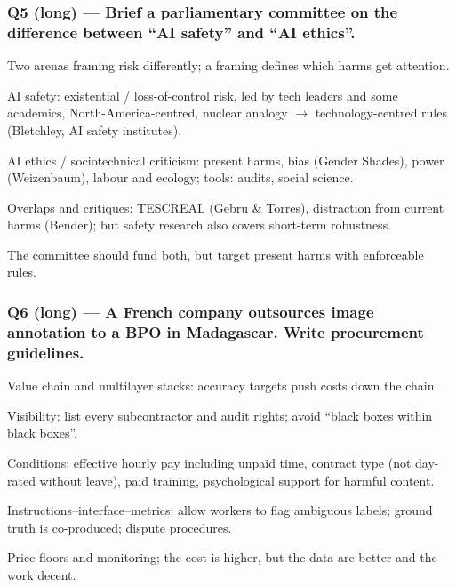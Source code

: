 \documentclass[11pt,a4paper]{article}
\newcommand{\blk}[1]{{\setlength{\fboxsep}{2pt}\colorbox{ink}{\sffamily\footnotesize\bfseries\color{white}\,#1\,}}}
\begin{document}
\subsubsection*{Q5 (long) — Brief a parliamentary committee on the difference between “AI safety” and “AI ethics”.}
\begin{description}[leftmargin=1.2cm,style=sameline]
\item[\blk{F}] Two arenas framing risk differently; a framing defines which harms get attention.
\item[\blk{A1}] AI safety: existential / loss-of-control risk, led by tech leaders and some academics, North-America-centred, nuclear analogy $\rightarrow$ technology-centred rules (Bletchley, AI safety institutes).
\item[\blk{A2}] AI ethics / sociotechnical criticism: present harms, bias (Gender Shades), power (Weizenbaum), labour and ecology; tools: audits, social science.
\item[\blk{A3}] Overlaps and critiques: TESCREAL (Gebru \& Torres), distraction from current harms (Bender); but safety research also covers short-term robustness.
\item[\blk{R}] The committee should fund both, but target present harms with enforceable rules.
\end{description}
\subsubsection*{Q6 (long) — A French company outsources image annotation to a BPO in Madagascar. Write procurement guidelines.}
\begin{description}[leftmargin=1.2cm,style=sameline]
\item[\blk{F}] Value chain and multilayer stacks: accuracy targets push costs down the chain.
\item[\blk{A1}] Visibility: list every subcontractor and audit rights; avoid “black boxes within black boxes”.
\item[\blk{A2}] Conditions: effective hourly pay including unpaid time, contract type (not day-rated without leave), paid training, psychological support for harmful content.
\item[\blk{A3}] Instructions–interface–metrics: allow workers to flag ambiguous labels; ground truth is co-produced; dispute procedures.
\item[\blk{R}] Price floors and monitoring; the cost is higher, but the data are better and the work decent.
\end{description}
\end{document}
